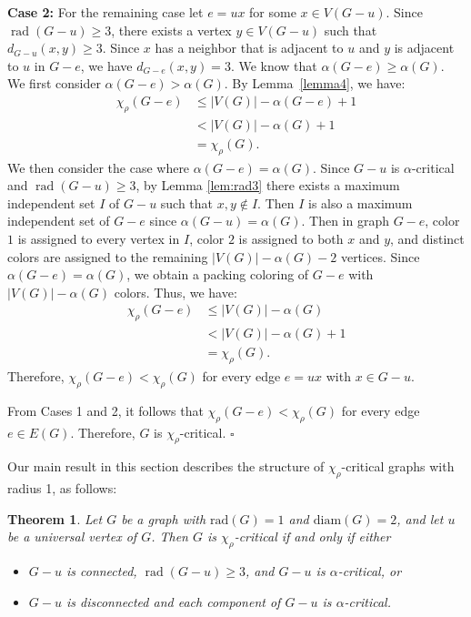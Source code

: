 \documentclass[12pt]{article}
\newtheorem{theorem}{Theorem}[section]
\newcommand{\qed}{\hfill $\square$ \bigskip}
\begin{document}
\textbf{Case 2:} For the remaining case let $e=ux$ for some $x \in V(G-u)$. Since $\operatorname{rad}(G-u)\ge 3$, there exists a vertex $y \in V(G-u)$ such that $d_{G-u}(x,y)\ge 3$. Since $x$ has a neighbor that is adjacent to $u$ and $y$ is adjacent to $u$ in $G-e$, we have $d_{G-e}(x,y)=3$. We know that $\alpha(G-e) \geq \alpha(G)$.
We first consider $\alpha(G-e)>\alpha(G)$.
By Lemma~\ref{lemma4}, we have:  
\begin{align*}
		\chi_\rho(G-e)&\leq|V(G)|-\alpha(G-e)+1 \\&<|V(G)|-\alpha(G)+1 \\ &=\chi_\rho(G).
\end{align*}
We then consider the case where \( \alpha(G - e) = \alpha(G) \). Since $G-u$ is $\alpha$-critical and $\operatorname{rad}(G-u)\ge 3$, by Lemma \ref{lem:rad3} there exists a maximum independent set $I$ of $G-u$ such that $x, y \notin I$. Then $I$ is also a maximum independent set of $G-e$ since $\alpha(G-u)=\alpha(G)$. 
Then in graph $G-e$, color $1$ is assigned to every vertex in $I$, color $2$ is assigned to both $x$ and $y$, and distinct colors are assigned to the remaining $|V(G)|-\alpha(G)-2$ vertices. Since $\alpha(G-e)=\alpha(G)$, we obtain a packing coloring of $G-e$ with $|V(G)|-\alpha(G)$ colors. Thus, we have:
	\begin{align*}
		\chi_\rho(G-e)&\le|V(G)|-\alpha(G) \\&<|V(G)|-\alpha(G)+1 \\ &=\chi_\rho(G). 
	\end{align*}
Therefore, $\chi_\rho(G-e) < \chi_\rho(G)$ for every edge $e=ux$ with $x \in G-u$. 

From Cases 1 and 2, it follows that $\chi_\rho(G-e) < \chi_\rho(G)$ for every edge $e \in E(G)$. Therefore, $G$ is $\chi_\rho$-critical.
\qed

Our main result in this section describes the structure of $\chi_\rho$-critical graphs with radius 1, as follows:

\begin{theorem}\label{thm:12}
Let $G$ be a graph with $\mathrm{rad}(G) = 1$  and  $\mathrm{diam}(G) = 2$, and let $u$ be a universal vertex of $G$. 
Then $G$ is $\chi_\rho$-critical if and only if either
\begin{itemize}
\item[(i)] $G-u$ is connected, $\operatorname{rad}(G-u)\ge 3$, and $G-u$ is $\alpha$-critical, or
\item[(ii)] $G-u$ is disconnected and each component of $G-u$ is $\alpha$-critical.
\end{itemize}
\end{theorem}
\end{document}

